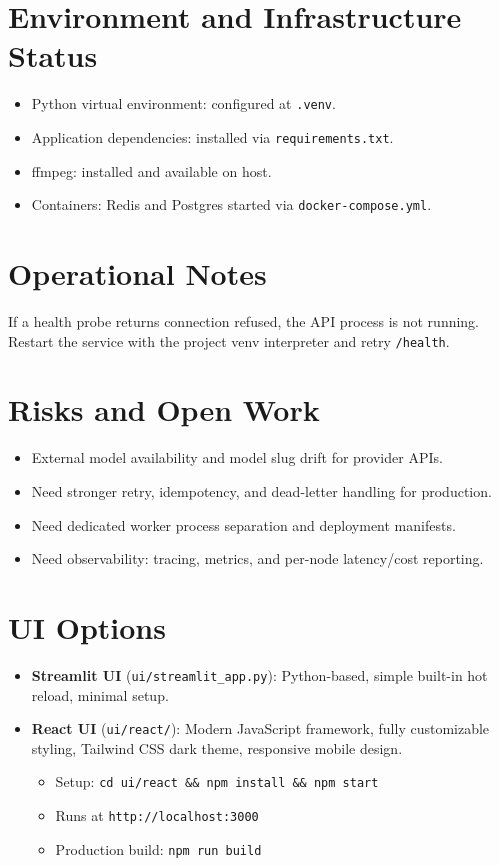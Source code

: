 \documentclass[11pt]{article}
\begin{document}
\section*{Environment and Infrastructure Status}
\begin{itemize}[leftmargin=*]
  \item Python virtual environment: configured at \texttt{.venv}.
  \item Application dependencies: installed via \texttt{requirements.txt}.
  \item ffmpeg: installed and available on host.
  \item Containers: Redis and Postgres started via \texttt{docker-compose.yml}.
\end{itemize}

\section*{Operational Notes}
If a health probe returns connection refused, the API process is not running. Restart the service with the project venv interpreter and retry \texttt{/health}.

\section*{Risks and Open Work}
\begin{itemize}[leftmargin=*]
  \item External model availability and model slug drift for provider APIs.
  \item Need stronger retry, idempotency, and dead-letter handling for production.
  \item Need dedicated worker process separation and deployment manifests.
  \item Need observability: tracing, metrics, and per-node latency/cost reporting.
\end{itemize}

\section*{UI Options}
\begin{itemize}[leftmargin=*]
  \item \textbf{Streamlit UI} (\texttt{ui/streamlit\_app.py}): Python-based, simple built-in hot reload, minimal setup.
  \item \textbf{React UI} (\texttt{ui/react/}): Modern JavaScript framework, fully customizable styling, Tailwind CSS dark theme, responsive mobile design.
  \begin{itemize}
    \item Setup: \texttt{cd ui/react \&\& npm install \&\& npm start}
    \item Runs at \texttt{http://localhost:3000}
    \item Production build: \texttt{npm run build}
  \end{itemize}
\end{itemize}
\end{document}
